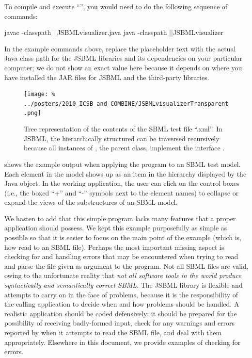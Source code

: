 To compile and execute ``'', you would need to do
the following sequence of commands:

\newcommand{\classpath}{\code{\emph{\color{winered}classpath}}\xspace}

\begin{example}[style=bash, title={Compiling and executing the example program.}]
  javac -classpath |\classpath|JSBMLvisualizer.java
  java -classpath |\classpath|JSBMLvisualizer
\end{example}

In the example commands above, replace the placeholder text \classpath with
the actual Java class path for the JSBML libraries and its dependencies on
your particular computer; we do not show an exact value here because it
depends on where you have installed the JAR files for JSBML and the
third-party libraries.

\begin{figure}
  \centering
  \vspace*{-1em}
  \setlength{\captionmargin}{1.8em}
  \texttt{[image: \%
    ../posters/2010\_ICSB\_and\_COMBINE/JSBMLvisualizerTransparent.png]}
  \caption[Tree representation of an SBML file]{Tree representation of
    the contents of the SBML test file ``.xml''. In JSBML,
    the hierarchically structured \SBMLDocument can be traversed
    recursively because all instances of \SBase, the parent class,
    implement the interface \TreeNode.}
  \label{fig:JSBMLvisualizer-output}
\end{figure}
 shows the example output when
applying the program to an SBML test model.  Each
element in the model shows up as an item in the hierarchy displayed by the
Java \JTree object. In the working application, the user can click on the
control boxes (i.e., the boxed ``+'' and ``-'' symbols next to the element
names) to collapse or expand the views of the substructures of an SBML
model.

We hasten to add that this simple program lacks many features that a proper
application should possess.  We kept this example purposefully as simple as
possible so that it is easier to focus on the main point of the example
(which is, how read to an SBML file).  Perhaps the most important missing
aspect is checking for and handling errors that may be encountered when
trying to read and parse the file given as argument to the program.  Not
all SBML files are valid, owing to the unfortunate reality that \emph{not
  all software tools in the world produce syntactically and semantically
  correct SBML}. The JSBML library is flexible and attempts to carry on in
the face of problems, because it is the responsibility of the calling
application to decide when and how problems should be handled. A realistic
application should be coded defensively: it should be prepared for the
possibility of receiving badly-formed input, check for any warnings and
errors reported by \SBMLReader when it attempts to read the SBML file, and
deal with them appropriately. Elsewhere in this document, we provide
examples of checking for errors.

